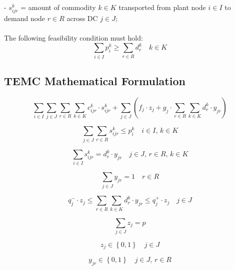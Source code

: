 \documentclass[a4paper,12pt,titlepage]{article}
\begin{document}
- $s_{ijr}^k$ = amount of commodity $k\in K$ transported from plant node $i\in I$ to demand node $r\in R$ across DC $j\in J$;\\
\\
The following feasibility condition must hold:\\
\begin{equation*}
\sum_{i\in I}p_i^k \geq \sum_{r\in R} d_r^k  \quad      k\in K
\end{equation*}

\subsection*{TEMC Mathematical Formulation} 
\begin{equation*}
\sum_{i\in I}\sum_{j\in J}\sum_{r\in R}\sum_{k\in K} c_{ijr}^k \cdot s_{ijr}^k +
\sum_{j\in J} \left( f_j \cdot z_j + g_j \cdot \sum_{r\in R}\sum_{k\in K} d_r^k \cdot y_{jr}             \right) 
\end{equation*}

\begin{equation*}
\sum_{j\in J}\sum_{r\in R} s_{ijr}^k \leq p_i^k \quad i\in I,\,k\in K
\tag{1}
\end{equation*}

\begin{equation*}
\sum_{i\in I} s_{ijr}^k = d_r^k \cdot y_{jr} \quad j\in J,\,r\in R,\,k\in K
\tag{2}
\end{equation*}

\begin{equation*}
\sum_{j\in J}y_{jr} = 1 \quad r\in R
\tag{3}
\end{equation*}

\begin{equation*}
q_j^-\cdot z_j \leq \sum_{r\in R}\sum_{k\in K}d_r^k \cdot y_{jr} \leq q_j^+\cdot z_j \quad j\in J
\tag{4}
\end{equation*}

\begin{equation*}
\sum_{j\in J} z_j = p
\tag{5}
\end{equation*}

\begin{equation*}
z_j \in \left\lbrace0,1\right\rbrace \quad j\in J
\tag{6}
\end{equation*}

\begin{equation*}
y_{jr} \in \left\lbrace0,1\right\rbrace \quad j\in J,\, r\in R
\tag{7}
\end{equation*}
\end{document}

